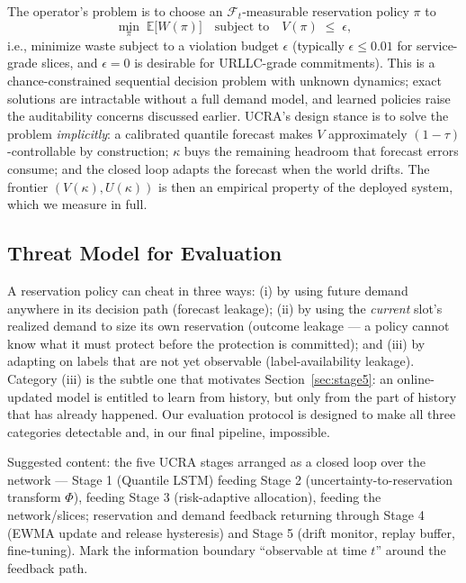 The operator's problem is to choose an
$\mathcal{F}_t$-measurable reservation policy $\pi$ to
\begin{equation}
\min_{\pi}\; \mathbb{E}\bigl[W(\pi)\bigr]
\quad \text{subject to} \quad
V(\pi) \;\le\; \epsilon,
\label{eq:objective}
\end{equation}
i.e., minimize waste subject to a violation budget $\epsilon$
(typically $\epsilon \le 0.01$ for service-grade slices, and
$\epsilon = 0$ is desirable for URLLC-grade commitments). This is a
chance-constrained sequential decision problem with unknown dynamics;
exact solutions are intractable without a full demand model, and
learned policies raise the auditability concerns discussed earlier.
UCRA's design stance is to solve the problem \emph{implicitly}:
a calibrated quantile forecast makes $V$ approximately
$(1-\tau)$-controllable by construction; $\kappa$ buys the remaining
headroom that forecast errors consume; and the closed loop adapts the
forecast when the world drifts. The frontier
$(V(\kappa), U(\kappa))$ is then an empirical property of the
 deployed system, which we measure in full.

\subsection{Threat Model for Evaluation}

A reservation policy can cheat in three ways: (i) by using future
demand anywhere in its decision path (forecast leakage); (ii) by
using the \emph{current} slot's realized demand to size its own
reservation (outcome leakage --- a policy cannot know what it must
protect before the protection is committed); and (iii) by adapting on
labels that are not yet observable (label-availability leakage).
Category (iii) is the subtle one that motivates
Section~\ref{sec:stage5}: an online-updated model is entitled to learn
from history, but only from the part of history that has already
happened. Our evaluation protocol is designed to make all three
categories detectable and, in our final pipeline, impossible.

{Suggested content: the five UCRA stages arranged as a closed loop
over the network --- Stage 1 (Quantile LSTM) feeding Stage 2
(uncertainty-to-reservation transform $\Phi$), feeding Stage 3
(risk-adaptive allocation), feeding the network/slices; reservation
and demand feedback returning through Stage 4 (EWMA update and
release hysteresis) and Stage 5 (drift monitor, replay buffer,
fine-tuning). Mark the information boundary ``observable at time $t$''
around the feedback path.}
